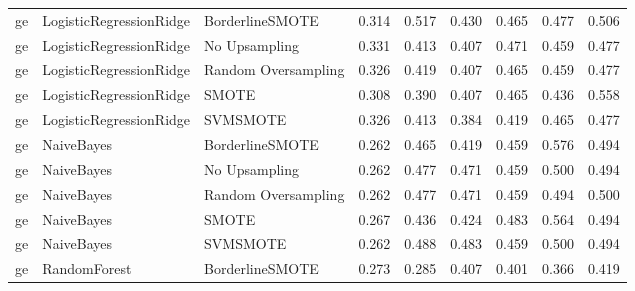 \begin{tabular}{lllllllll}
      ge &      LogisticRegressionRidge &     BorderlineSMOTE &     0.314 &                     0.517 &                 0.430 &                  0.465 &                                   0.477 &     0.506 \\
      ge &      LogisticRegressionRidge &       No Upsampling &     0.331 &                     0.413 &                 0.407 &                  0.471 &                                   0.459 &     0.477 \\
      ge &      LogisticRegressionRidge & Random Oversampling &     0.326 &                     0.419 &                 0.407 &                  0.465 &                                   0.459 &     0.477 \\
      ge &      LogisticRegressionRidge &               SMOTE &     0.308 &                     0.390 &                 0.407 &                  0.465 &                                   0.436 &     0.558 \\
      ge &      LogisticRegressionRidge &            SVMSMOTE &     0.326 &                     0.413 &                 0.384 &                  0.419 &                                   0.465 &     0.477 \\
      ge &                   NaiveBayes &     BorderlineSMOTE &     0.262 &                     0.465 &                 0.419 &                  0.459 &                                   0.576 &     0.494 \\
      ge &                   NaiveBayes &       No Upsampling &     0.262 &                     0.477 &                 0.471 &                  0.459 &                                   0.500 &     0.494 \\
      ge &                   NaiveBayes & Random Oversampling &     0.262 &                     0.477 &                 0.471 &                  0.459 &                                   0.494 &     0.500 \\
      ge &                   NaiveBayes &               SMOTE &     0.267 &                     0.436 &                 0.424 &                  0.483 &                                   0.564 &     0.494 \\
      ge &                   NaiveBayes &            SVMSMOTE &     0.262 &                     0.488 &                 0.483 &                  0.459 &                                   0.500 &     0.494 \\
      ge &                 RandomForest &     BorderlineSMOTE &     0.273 &                     0.285 &                 0.407 &                  0.401 &                                   0.366 &     0.419 \\

\end{tabular}
